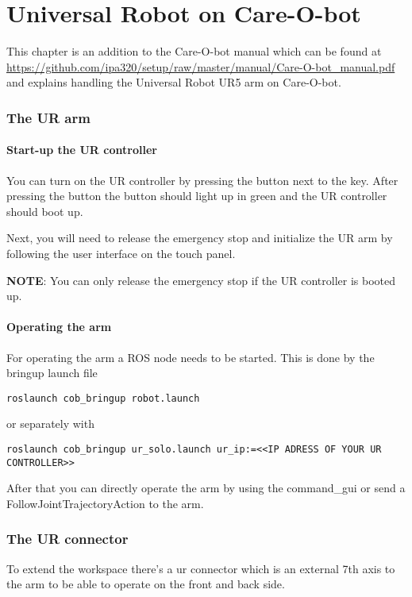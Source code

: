 \documentclass[12pt,twoside]{report}
\begin{document}
\chapter{Universal Robot on Care-O-bot}
This chapter is an addition to the Care-O-bot manual which can be found at \url{https://github.com/ipa320/setup/raw/master/manual/Care-O-bot_manual.pdf} and explains handling the Universal Robot UR5 arm on Care-O-bot.

\subsection{The UR arm}

\subsubsection{Start-up the UR controller}
You can turn on the UR controller by pressing the button next to the key. After pressing the button the button should light up in green and the UR controller should boot up.

Next, you will need to release the emergency stop and initialize the UR arm by following the user interface on the touch panel.

\textbf{NOTE}: You can only release the emergency stop if the UR controller is booted up.

\subsubsection{Operating the arm}
For operating the arm a ROS node needs to be started. This is done by the bringup launch file
\begin{lstlisting}
roslaunch cob_bringup robot.launch
\end{lstlisting}
or separately with 
\begin{lstlisting}
roslaunch cob_bringup ur_solo.launch ur_ip:=<<IP ADRESS OF YOUR UR CONTROLLER>>
\end{lstlisting}
After that you can directly operate the arm by using the command\_gui or send a FollowJointTrajectoryAction to the arm.

\subsection{The UR connector}
To extend the workspace there's a ur connector which is an external 7th axis to the arm to be able to operate on the front and back side.
\end{document}
